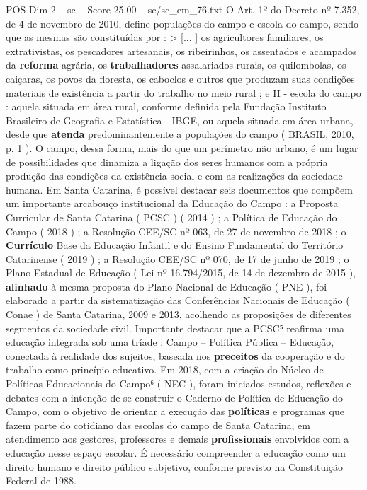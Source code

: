 \begin{textsample}{POS Dim 2 – sc – Score 25.00 – sc/sc\_em\_76.txt}
O Art. 1º do Decreto nº 7.352, de 4 de novembro de 2010, define populações do campo e escola do campo, sendo que as mesmas são constituídas por : > [... ] os agricultores familiares, os extrativistas, os pescadores artesanais, os ribeirinhos, os assentados e acampados da \textbf{reforma} agrária, os \textbf{trabalhadores} assalariados rurais, os quilombolas, os caiçaras, os povos da floresta, os caboclos e outros que produzam suas condições materiais de existência a partir do trabalho no meio rural ; e II - escola do campo : aquela situada em área rural, conforme definida pela Fundação Instituto Brasileiro de Geografia e Estatística - IBGE, ou aquela situada em área urbana, desde que \textbf{atenda} predominantemente a populações do campo ( BRASIL, 2010, p. 1 ).
O campo, dessa forma, mais do que um perímetro não urbano, é um lugar de possibilidades que dinamiza a ligação dos seres humanos com a própria produção das condições da existência social e com as realizações da sociedade humana.
Em Santa Catarina, é possível destacar seis documentos que compõem um importante arcabouço institucional da Educação do Campo : a Proposta Curricular de Santa Catarina ( PCSC ) ( 2014 ) ; a Política de Educação do Campo ( 2018 ) ; a Resolução CEE/SC nº 063, de 27 de novembro de 2018 ; o \textbf{Currículo} Base da Educação Infantil e do Ensino Fundamental do Território Catarinense ( 2019 ) ; a Resolução CEE/SC nº 070, de 17 de junho de 2019 ; o Plano Estadual de Educação ( Lei nº 16.794/2015, de 14 de dezembro de 2015 ), \textbf{alinhado} à mesma proposta do Plano Nacional de Educação ( PNE ), foi elaborado a partir da sistematização das Conferências Nacionais de Educação ( Conae ) de Santa Catarina, 2009 e 2013, acolhendo as proposições de diferentes segmentos da sociedade civil.
Importante destacar que a PCSC⁵ reafirma uma educação integrada sob uma tríade : Campo – Política Pública – Educação, conectada à realidade dos sujeitos, baseada nos \textbf{preceitos} da cooperação e do trabalho como princípio educativo.
Em 2018, com a criação do Núcleo de Políticas Educacionais do Campo⁶ ( NEC ), foram iniciados estudos, reflexões e debates com a intenção de se construir o Caderno de Política de Educação do Campo, com o objetivo de orientar a execução das \textbf{políticas} e programas que fazem parte do cotidiano das escolas do campo de Santa Catarina, em atendimento aos gestores, professores e demais \textbf{profissionais} envolvidos com a educação nesse espaço escolar.
É necessário compreender a educação como um direito humano e direito público subjetivo, conforme previsto na Constituição Federal de 1988.

\end{textsample}

